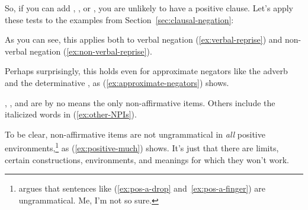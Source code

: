 \noindent So, if you can add , , or , you are unlikely to have a positive clause. Let's apply these tests to the examples from Section~\ref{sec:clausal-negation}:

\ea \label{ex:clausal-reprise1}
    \z
\z
As you can see, this applies both to verbal negation (\ref{ex:verbal-reprise}) and non-verbal negation (\ref{ex:non-verbal-reprise}).

\ea \label{ex:verbal-reprise}
    \ea
        \z
    \ex
        \z
    \z
\z


\ea \label{ex:non-verbal-reprise}
    \ea
        \z
    \ex
        \z
    \z
\z
Perhaps surprisingly, this holds even for approximate negators like the adverb  and the determinative , as (\ref{ex:approximate-negators}) shows.

\ea \label{ex:approximate-negators}
    \ea
        \z
    \ex
        \z
    \z
\z
{}, , and  are by no means the only non-affirmative items. Others include the italicized words in (\ref{ex:other-NPIs}).

\ea \label{ex:other-NPIs}
    \ea
        \z
    \ex
        \z
    \ex
         \label{ex:pos-a-drop}
        \z
    \ex
         \label{ex:pos-a-finger}
        \z
    \z
\z
To be clear, non-affirmative items are not ungrammatical in \emph{all} positive environments,\footnote{\citet[3--4]{Israel2011} argues that sentences like  (\ref{ex:pos-a-drop} and~\ref{ex:pos-a-finger}) are ungrammatical. Me, I'm not so sure.} as (\ref{ex:positive-much}) shows. It's just that there are limits, certain constructions, environments, and meanings for which they won't work.


